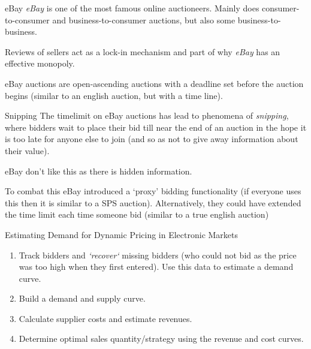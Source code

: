 \documentclass[11pt,a4paper]{article}
\begin{document}
\begin{remark}{eBay}
  \textit{eBay} is one of the most famous online auctioneers. Mainly does consumer-to-consumer and business-to-consumer auctions, but also some business-to-business.
  \par Reviews of sellers act as a lock-in mechanism and part of why \textit{eBay} has an effective monopoly.
  \par eBay auctions are open-ascending auctions with a deadline set before the auction begins (similar to an english auction, but with a time line).
\end{remark}

\begin{remark}{Snipping}
  The timelimit on eBay auctions has lead to phenomena of \textit{snipping}, where bidders wait to place their bid till near the end of an auction in the hope it is too late for anyone else to join (and so as not to give away information about their value).
  \par eBay don't like this as there is hidden information.
  \par To combat this eBay introduced a `proxy' bidding functionality (if everyone uses this then it is similar to a SPS auction). Alternatively, they could have extended the time limit each time someone bid (similar to a true english auction)
\end{remark}

\begin{proposition}{Estimating Demand for Dynamic Pricing in Electronic Markets}
  \begin{enumerate}
    \item Track bidders and \textit{`recover`} missing bidders (who could not bid as the price was too high when they first entered). Use this data to estimate a demand curve.
    \item Build a demand and supply curve.
    \item Calculate supplier costs and estimate revenues.
    \item Determine optimal sales quantity/strategy using the revenue and cost curves.
  \end{enumerate}
\end{proposition}
\end{document}

